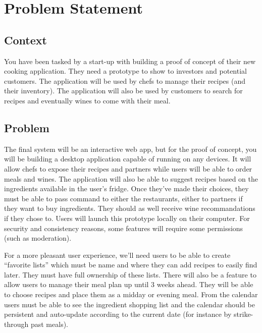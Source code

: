\documentclass[english,12pt,twoside,a4paper]{article}
\begin{document}
\setlength{\columnsep}{1cm}
\tableofcontents
\clearpage

\hypersetup{linkcolor=red}

\section{Problem Statement}
\subsection{Context}
You have been tasked by a start-up with building a proof of concept of their new cooking application. They need a prototype to show to investors and potential customers. The application will be used by chefs to manage their recipes (and their inventory). The application will also be used by customers to search for recipes and eventually wines to come with their meal.
\subsection{Problem}
The final system will be an interactive web app, but for the proof of concept, you will be building a desktop application capable of running on any devices. It will allow chefs to expose their recipes and partners while users will be able to order meals and wines. The application will also be able to suggest recipes based on the ingredients available in the user's fridge. Once they’ve made their choices, they must be able to pass command to either the restaurants, either to partners if they want to buy ingredients. They should as well receive wine recommandations if they chose to. Users will launch this prototype locally on their computer. For security and consistency reasons, some features will require some permissions (such as moderation).

For a more pleasant user experience, we’ll need users to be able to create “favorite lists” which must be name and where they can add recipes to easily find later. They must have full ownership of these lists. There will also be a feature to allow users to manage their meal plan up until 3 weeks ahead. They will be able to choose recipes and place them as a midday or evening meal. From the calendar users must be able to see the ingredient shopping list and the calendar should be persistent and auto-update according to the current date (for instance by strike-through past meals).
\end{document}
